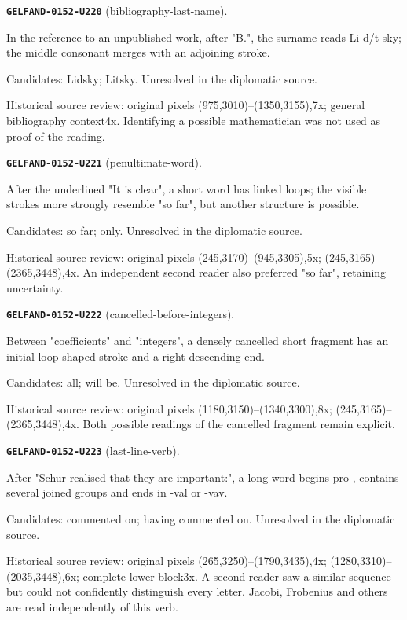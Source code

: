 \par\noindent\leavevmode{}\label{GELFAND-0152-U220}\textbf{\texttt{GELFAND-0152-U220}} (bibliography-last-name).\nopagebreak[4]\par
In the reference to an unpublished work, after "B.", the surname reads Li-d/t-sky; the middle consonant merges with an adjoining stroke.\par
Candidates: Lidsky; Litsky. Unresolved in the diplomatic source.\par
Historical source review: original pixels (975,3010)–(1350,3155),7x; general bibliography context4x. Identifying a possible mathematician was not used as proof of the reading.\par\medskip
\par\noindent\leavevmode{}\label{GELFAND-0152-U221}\textbf{\texttt{GELFAND-0152-U221}} (penultimate-word).\nopagebreak[4]\par
After the underlined "It is clear", a short word has linked loops; the visible strokes more strongly resemble "so far", but another structure is possible.\par
Candidates: so far; only. Unresolved in the diplomatic source.\par
Historical source review: original pixels (245,3170)–(945,3305),5x; (245,3165)–(2365,3448),4x. An independent second reader also preferred "so far", retaining uncertainty.\par\medskip
\par\noindent\leavevmode{}\label{GELFAND-0152-U222}\textbf{\texttt{GELFAND-0152-U222}} (cancelled-before-integers).\nopagebreak[4]\par
Between "coefficients" and "integers", a densely cancelled short fragment has an initial loop-shaped stroke and a right descending end.\par
Candidates: all; will be. Unresolved in the diplomatic source.\par
Historical source review: original pixels (1180,3150)–(1340,3300),8x; (245,3165)–(2365,3448),4x. Both possible readings of the cancelled fragment remain explicit.\par\medskip
\par\noindent\leavevmode{}\label{GELFAND-0152-U223}\textbf{\texttt{GELFAND-0152-U223}} (last-line-verb).\nopagebreak[4]\par
After "Schur realised that they are important:", a long word begins pro-, contains several joined groups and ends in -val or -vav.\par
Candidates: commented on; having commented on. Unresolved in the diplomatic source.\par
Historical source review: original pixels (265,3250)–(1790,3435),4x; (1280,3310)–(2035,3448),6x; complete lower block3x. A second reader saw a similar sequence but could not confidently distinguish every letter. Jacobi, Frobenius and others are read independently of this verb.\par\medskip
